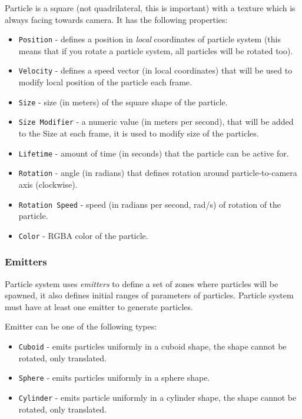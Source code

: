 \documentclass[
]{book}
\providecommand{\tightlist}{%
  \setlength{\itemsep}{0pt}\setlength{\parskip}{0pt}}
\theoremstyle{definition}
\theoremstyle{definition}
\theoremstyle{definition}
\theoremstyle{definition}
\theoremstyle{remark}
\begin{document}
Particle is a square (not quadrilateral, this is important) with a texture which is always facing towards camera. It has the following properties:

\begin{itemize}
\tightlist
\item
  \texttt{Position} - defines a position in \emph{local} coordinates of particle system (this means that if you rotate a particle system, all particles will be rotated too).
\item
  \texttt{Velocity} - defines a speed vector (in local coordinates) that will be used to modify local position of the particle each frame.
\item
  \texttt{Size} - size (in meters) of the square shape of the particle.
\item
  \texttt{Size\ Modifier} - a numeric value (in meters per second), that will be added to the Size at each frame, it is used to modify size of the particles.
\item
  \texttt{Lifetime} - amount of time (in seconds) that the particle can be active for.
\item
  \texttt{Rotation} - angle (in radians) that defines rotation around particle-to-camera axis (clockwise).
\item
  \texttt{Rotation\ Speed} - speed (in radians per second, rad/s) of rotation of the particle.
\item
  \texttt{Color} - RGBA color of the particle.
\end{itemize}

\subsubsection{Emitters}\label{emitters}

Particle system uses \emph{emitters} to define a set of zones where particles will be spawned, it also defines initial ranges of parameters of particles. Particle system must have at least one emitter to generate particles.

Emitter can be one of the following types:

\begin{itemize}
\tightlist
\item
  \texttt{Cuboid} - emits particles uniformly in a cuboid shape, the shape cannot be rotated, only translated.
\item
  \texttt{Sphere} - emits particles uniformly in a sphere shape.
\item
  \texttt{Cylinder} - emits particle uniformly in a cylinder shape, the shape cannot be rotated, only translated.
\end{itemize}
\end{document}

